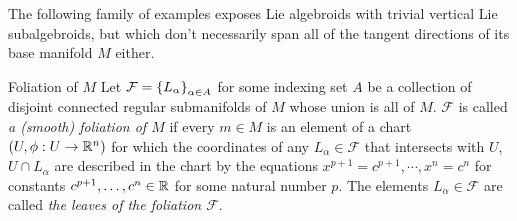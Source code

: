 


The following family of examples exposes Lie algebroids with trivial vertical Lie subalgebroids, but which don't necessarily span all of the tangent directions of its base manifold $M$ either.

\begin{definition} {Foliation of $M$}
Let $\mathcal F = \left\{ L_\alpha \right\}_{\alpha \in A}$ for some indexing set $A$ be a collection of disjoint connected regular submanifolds of $M$ whose union is all of $M$. $\mathcal F$ is called \emph{a %
(smooth) foliation of $M$} if every $m \in M$ is an element of a chart $(U, \phi:U \to \RR^n)$ for which the coordinates of any $L_\alpha \in \mathcal F$ that intersects with $U$, $U \cap L_\alpha$ are described in the chart by the equations $x^{p+1} = c^{p+1}, \cdots , x^{n} = c^{n} $ for constants $c^{p+1}, \dots, c^n \in \mathbb{R}$ for some natural number $p$. The elements $L_\alpha \in \mathcal F$ are called \emph{the leaves of the foliation $\mathcal F$}.
\end{definition}

